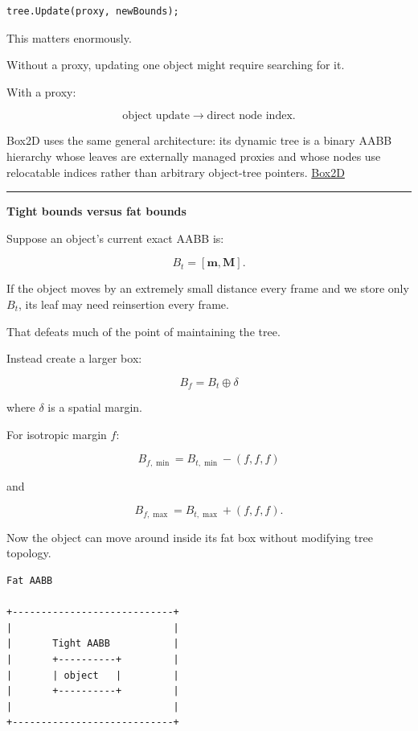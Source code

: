 \begin{verbatim}
tree.Update(proxy, newBounds);
\end{verbatim}

This matters enormously.

Without a proxy, updating one object might require searching for it.

With a proxy:

\[
\text{object update}
\rightarrow
\text{direct node index}.
\]

Box2D uses the same general architecture: its dynamic tree is a binary AABB hierarchy whose leaves are externally managed proxies and whose nodes use relocatable indices rather than arbitrary object-tree pointers. \href{https://box2d.org/documentation/group__tree.html?utm_source=chatgpt.com}{Box2D}

\begin{center}\rule{0.5\linewidth}{0.5pt}\end{center}

\textbf{Tight bounds versus fat bounds}

Suppose an object's current exact AABB is:

\[
B_t=
[\mathbf m,\mathbf M].
\]

If the object moves by an extremely small distance every frame and we store only \(B_t\), its leaf may need reinsertion every frame.

That defeats much of the point of maintaining the tree.

Instead create a larger box:

\[
B_f=B_t\oplus \delta
\]

where \(\delta\) is a spatial margin.

For isotropic margin \(f\):

\[
B_{f,\min}
=
B_{t,\min}-(f,f,f)
\]

and

\[
B_{f,\max}
=
B_{t,\max}+(f,f,f).
\]

Now the object can move around inside its fat box without modifying tree topology.

\begin{verbatim}
Fat AABB

+----------------------------+
|                            |
|       Tight AABB           |
|       +----------+         |
|       | object   |         |
|       +----------+         |
|                            |
+----------------------------+
\end{verbatim}

